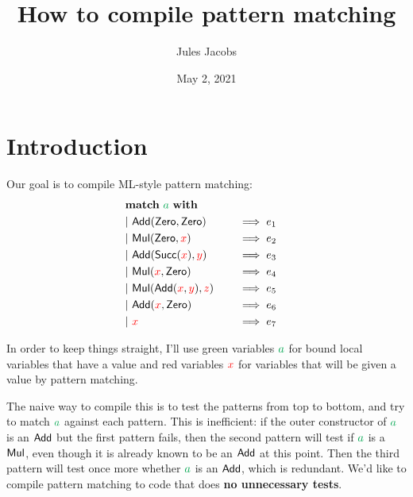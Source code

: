 \documentclass[a4paper, 11pt]{article}
\title{How to compile pattern matching}
\author{Jules Jacobs}
\date{May 2, 2021}
\theoremstyle{definition}
\begin{document}
\maketitle



\newcommand{\matchwith}[1]{&\mathbf{match}\ #1\ \mathbf{with}}
\newcommand{\clause}[2]{&\mathbf{\mid}\ #1\quad &&\implies #2 &}
\newcommand{\multimatch}{&\mathbf{multimatch}}
\newcommand{\constr}[1]{\mathsf{\textcolor{black}{#1}}}
\newcommand{\Add}{\constr{Add}}
\newcommand{\Mul}{\constr{Mul}}
\newcommand{\Zero}{\constr{Zero}}
\newcommand{\Succ}{\constr{Succ}}
\newcommand{\Var}{\constr{Var}}
\newcommand{\pat}{\mathcal{P}}
\newcommand{\C}{\constr{C}}
\newcommand{\fvar}[1]{\textcolor{red}{#1}}
\newcommand{\bvar}[1]{\textcolor{Green}{#1}}
\newcommand{\ba}{\bvar{a}}
\newcommand{\lett}[2]{\mathsf{let}\ #1 = #2\ \mathsf{in}\ }


\section{Introduction}

Our goal is to compile ML-style pattern matching:
\begin{alignat*}{4}
  \matchwith{\ba} \\
  \clause{\Add(\Zero, \Zero)}{e_1} \\
  \clause{\Mul(\Zero, \fvar{x})}{e_2} \\
  \clause{\Add(\Succ(\fvar x), \fvar y)}{e_3} \\
  \clause{\Mul(\fvar x, \Zero)}{e_4} \\
  \clause{\Mul(\Add(\fvar x, \fvar y), \fvar z)}{e_5} \\
  \clause{\Add(\fvar x, \Zero)}{e_6} \\
  \clause{\fvar x}{e_7} \\
\end{alignat*}

In order to keep things straight, I'll use green variables $\ba$ for bound local variables that have a value and red variables $\fvar{x}$ for variables that will be given a value by pattern matching.

The naive way to compile this is to test the patterns from top to bottom, and try to match $\ba$ against each pattern. This is inefficient: if the outer constructor of $\ba$ is an $\Add$ but the first pattern fails, then the second pattern will test if $\ba$ is a $\Mul$, even though it is already known to be an $\Add$ at this point. Then the third pattern will test once more whether $\ba$ is an $\Add$, which is redundant. We'd like to compile pattern matching to code that does \textbf{no unnecessary tests}.
\end{document}
